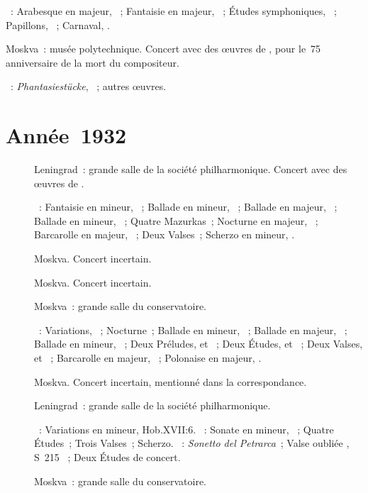 \begin{description}
 \textsc{\Schumann{}}~: Arabesque en \kC majeur, ~; Fantaisie en
 \kC majeur, ~; Études symphoniques, ~; Papillons,
 ~; Carnaval, .
 \item[\DateWithWeekDay{1931-12-25}]
 Moskva~: musée polytechnique.
 Concert avec des œuvres de \Schumann{}, pour le~75\ieme{} anniversaire de
 la mort du compositeur.

 \textsc{\Schumann{}}~: \emph{Phantasiestücke}, ~; autres œuvres.
\end{description}

\section{Année~1932}

\begin{description}
 \item[]
 Leningrad~: grande salle de la société philharmonique.
 Concert avec des œuvres de \Chopin{}.

 \textsc{\Chopin{}}~: Fantaisie en \kF mineur, ~; Ballade en \kF
 mineur, ~; Ballade en \kA \Flat majeur, ~; Ballade en \kG
 mineur, ~; Quatre Mazurkas~; Nocturne en \kF \Sharp majeur,
  ~; Barcarolle en \kF \Sharp majeur, ~; Deux
 Valses~; Scherzo en \kB mineur, .
 \item[]
 Moskva.
 Concert incertain.
 \item[]
 Moskva.
 Concert incertain.
 \item[]
 Moskva~: grande salle du conservatoire.

 \textsc{\Chopin{}}~: Variations, ~; Nocturne~; Ballade en \kG
 mineur, ~; Ballade en \kA \Flat majeur, ~; Ballade en \kF
 mineur, ~; Deux Préludes,   et ~;
 Deux Études,   et  ~; Deux Valses,
   et  ~; Barcarolle en \kF \Sharp
 majeur, ~; Polonaise en \kA \Flat majeur, .
 \item[]
 Moskva.
 Concert incertain, mentionné dans la correspondance.
 \item[]
 Leningrad~: grande salle de la société philharmonique.

 \textsc{\Haydn{}}~: Variations en \kF mineur, Hob.XVII:6.
 \textsc{\Chopin{}}~: Sonate en \kB \Flat mineur, ~; Quatre
 Études~; Trois Valses~; Scherzo.
 \textsc{\Liszt{}}~: \emph{Sonetto del Petrarca}~; Valse oubliée ,
 S~215 ~; Deux Études de concert.
 \item[]
 Moskva~: grande salle du conservatoire.


\end{description}
